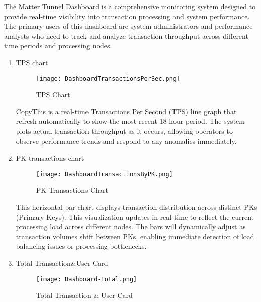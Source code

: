 \documentclass[conference]{IEEEtran}
\begin{document}
The Matter Tunnel Dashboard is a comprehensive monitoring system designed to provide real-time visibility into transaction processing and system performance. The primary users of this dashboard are system administrators and performance analysts who need to track and analyze transaction throughput across different time periods and processing nodes.
\begin{enumerate}[itemsep=2ex, parsep=1ex]
	\item TPS chart
	      	      	      
	      \begin{figure}[h!]
	      	\centering
	      	\texttt{[image: DashboardTransactionsPerSec.png]}
	      	\caption{TPS Chart}
	      	\label{fig:TPSChart}
	      \end{figure}
	      	      	      
	      CopyThis is a real-time Transactions Per Second (TPS) line graph that refresh automatically to show the most recent 18-hour-period. The system plots actual transaction throughput as it occurs, allowing operators to observe performance trends and respond to any anomalies immediately.
	      	      	      
	\item PK transactions chart
	      	      	      
	      \begin{figure}[h!]
	      	\centering
	      	\texttt{[image: DashboardTransactionsByPK.png]}
	      	\caption{PK Transactions Chart}
	      	\label{fig:PKTransactionsChart}
	      \end{figure}
	      	      	      
	      This horizontal bar chart displays transaction distribution across distinct PKs (Primary Keys). This visualization updates in real-time to reflect the current processing load across different nodes. The bars will dynamically adjust as transaction volumes shift between PKs, enabling immediate detection of load balancing issues or processing bottlenecks.
	      	      	      
	\item Total Transaction\&User Card
	      	      	      
	      \begin{figure}[h!]
	      	\centering
	      	\texttt{[image: Dashboard-Total.png]}
	      	\caption{Total Transaction \& User Card}
	      	\label{fig:TotalTransactionUserCard}
	      \end{figure}
	      	      	      

\end{enumerate}
\end{document}
